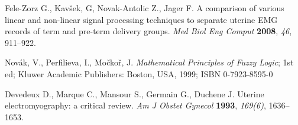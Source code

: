 \documentclass[bioengineering,article,submit,moreauthors,pdftex,10pt,a4paper]{mdpi}
\begin{document}
\begin{thebibliography}{999}
Fele-Zorz G., Kavšek, G, Novak-Antolic Z., Jager F.  A comparison of various linear and non-linear signal processing techniques to separate uterine EMG records of term and pre-term delivery groups. {\em Med Biol Eng Comput} {\bf 2008}, {\em 46}, 911–922.	

Novák, V., Perfilieva, I., Močkoř, J. {\em Mathematical Principles of Fuzzy Logic}; 1st ed; Kluwer Academic Publishers: Boston,
USA, 1999; ISBN 0-7923-8595-0

Devedeux D., Marque C., Mansour S., Germain G., Duchene J. Uterine electromyography: a critical review. {\em Am J Obstet Gynecol} {\bf 1993}, {\em 169(6)}, 1636–1653.	





	
 




\end{thebibliography}


%


\end{document}
